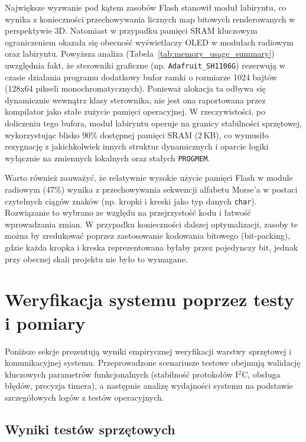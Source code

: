 \documentclass{SGGW-thesis}
\begin{document}
Największe wyzwanie pod kątem zasobów Flash stanowił moduł labiryntu, co wynika z konieczności przechowywania licznych map bitowych renderowanych w perspektywie 3D. Natomiast w przypadku pamięci SRAM kluczowym ograniczeniem okazała się obecność wyświetlaczy OLED w modułach radiowym oraz labiryntu. Powyższa analiza (Tabela~\ref{tab:memory_usage_summary}) uwzględnia fakt, że sterowniki graficzne (np. \texttt{Adafruit\_SH1106G}) rezerwują w czasie działania programu dodatkowy bufor ramki o rozmiarze 1024 bajtów (128x64 pikseli monochromatycznych). Ponieważ alokacja ta odbywa się dynamicznie wewnątrz klasy sterownika, nie jest ona raportowana przez kompilator jako stałe zużycie pamięci operacyjnej. W rzeczywistości, po doliczeniu tego bufora, moduł labiryntu operuje na granicy stabilności sprzętowej, wykorzystując blisko 90\% dostępnej pamięci SRAM (2\,KB), co wymusiło rezygnację z jakichkolwiek innych struktur dynamicznych i oparcie logiki wyłącznie na zmiennych lokalnych oraz stałych \texttt{PROGMEM}.

Warto również zauważyć, że relatywnie wysokie użycie pamięci Flash w module radiowym (47\%) wynika z przechowywania sekwencji alfabetu Morse'a w postaci czytelnych ciągów znaków (np. kropki i kreski jako typ danych \texttt{char}). Rozwiązanie to wybrano ze względu na przejrzystość kodu i łatwość wprowadzania zmian. W przypadku konieczności dalszej optymalizacji, zasoby te można by zredukować poprzez zastosowanie kodowania bitowego (bit-packing), gdzie każda kropka i kreska reprezentowana byłaby przez pojedynczy bit, jednak przy obecnej skali projektu nie było to wymagane.

\section{Weryfikacja systemu poprzez testy i pomiary}
Poniższe sekcje prezentują wyniki empirycznej weryfikacji warstwy sprzętowej i komunikacyjnej systemu. Przeprowadzone scenariusze testowe obejmują walidację kluczowych parametrów funkcjonalnych (stabilność protokołów I$^2$C, obsługa błędów, precyzja timera), a następnie analizę wydajności systemu na podstawie szczegółowych logów z testów operacyjnych.

\subsection{Wyniki testów sprzętowych}
\end{document}
